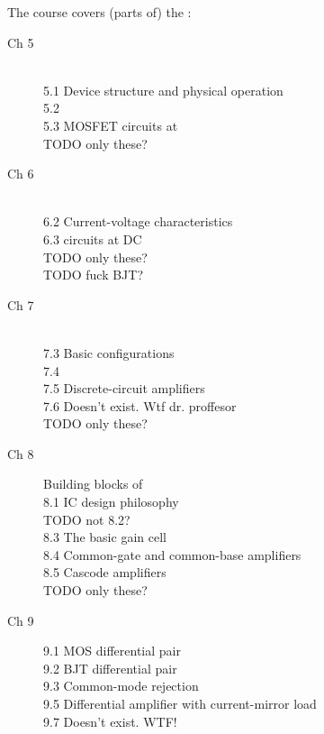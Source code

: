 The course covers (parts of) the :

\begin{description}
  \item [Ch 5]  \\
               5.1 Device structure and physical operation \\
               5.2  \\
               5.3 MOSFET circuits at  \\
               TODO only these?
  \item [Ch 6]  \\
               6.2 Current-voltage characteristics \\
               6.3  circuits at DC \\
               TODO only these? \\
               TODO fuck BJT?
  \item [Ch 7]  \\
               7.3 Basic configurations \\
               7.4  \\
               7.5 Discrete-circuit amplifiers \\
               7.6 Doesn't exist. Wtf dr. proffesor \\
               TODO only these?
  \item [Ch 8] Building blocks of  \\
               8.1 IC design philosophy \\
               TODO not 8.2? \\
               8.3 The basic gain cell \\
               8.4 Common-gate and common-base amplifiers \\
               8.5 Cascode amplifiers \\
               TODO only these?
  \item [Ch 9] 
               9.1 MOS differential pair \\
               9.2 BJT differential pair \\
               9.3 Common-mode rejection \\
               9.5 Differential amplifier with current-mirror load \\
               9.7 Doesn't exist. WTF! \\

\end{description}
